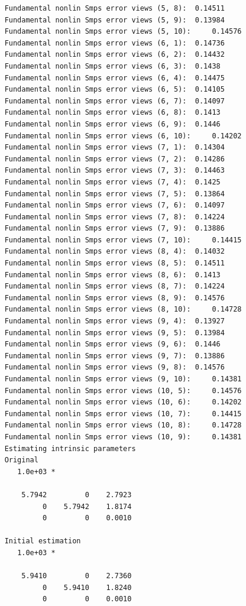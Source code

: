 \documentclass[11pt]{article}
\begin{document}
\begin{verbatim}
    Fundamental nonlin Smps error views (5, 8):	 0.14511 
    Fundamental nonlin Smps error views (5, 9):	 0.13984 
    Fundamental nonlin Smps error views (5, 10):	 0.14576 
    Fundamental nonlin Smps error views (6, 1):	 0.14736 
    Fundamental nonlin Smps error views (6, 2):	 0.14432 
    Fundamental nonlin Smps error views (6, 3):	 0.1438 
    Fundamental nonlin Smps error views (6, 4):	 0.14475 
    Fundamental nonlin Smps error views (6, 5):	 0.14105 
    Fundamental nonlin Smps error views (6, 7):	 0.14097 
    Fundamental nonlin Smps error views (6, 8):	 0.1413 
    Fundamental nonlin Smps error views (6, 9):	 0.1446 
    Fundamental nonlin Smps error views (6, 10):	 0.14202 
    Fundamental nonlin Smps error views (7, 1):	 0.14304 
    Fundamental nonlin Smps error views (7, 2):	 0.14286 
    Fundamental nonlin Smps error views (7, 3):	 0.14463 
    Fundamental nonlin Smps error views (7, 4):	 0.1425 
    Fundamental nonlin Smps error views (7, 5):	 0.13864 
    Fundamental nonlin Smps error views (7, 6):	 0.14097 
    Fundamental nonlin Smps error views (7, 8):	 0.14224 
    Fundamental nonlin Smps error views (7, 9):	 0.13886 
    Fundamental nonlin Smps error views (7, 10):	 0.14415 
    Fundamental nonlin Smps error views (8, 4):	 0.14032 
    Fundamental nonlin Smps error views (8, 5):	 0.14511 
    Fundamental nonlin Smps error views (8, 6):	 0.1413 
    Fundamental nonlin Smps error views (8, 7):	 0.14224 
    Fundamental nonlin Smps error views (8, 9):	 0.14576 
    Fundamental nonlin Smps error views (8, 10):	 0.14728 
    Fundamental nonlin Smps error views (9, 4):	 0.13927 
    Fundamental nonlin Smps error views (9, 5):	 0.13984 
    Fundamental nonlin Smps error views (9, 6):	 0.1446 
    Fundamental nonlin Smps error views (9, 7):	 0.13886 
    Fundamental nonlin Smps error views (9, 8):	 0.14576 
    Fundamental nonlin Smps error views (9, 10):	 0.14381 
    Fundamental nonlin Smps error views (10, 5):	 0.14576 
    Fundamental nonlin Smps error views (10, 6):	 0.14202 
    Fundamental nonlin Smps error views (10, 7):	 0.14415 
    Fundamental nonlin Smps error views (10, 8):	 0.14728 
    Fundamental nonlin Smps error views (10, 9):	 0.14381 
    Estimating intrinsic parameters
    Original
       1.0e+03 *
    
        5.7942         0    2.7923
             0    5.7942    1.8174
             0         0    0.0010
    
    Initial estimation
       1.0e+03 *
    
        5.9410         0    2.7360
             0    5.9410    1.8240
             0         0    0.0010
    

\end{verbatim}
\end{document}
